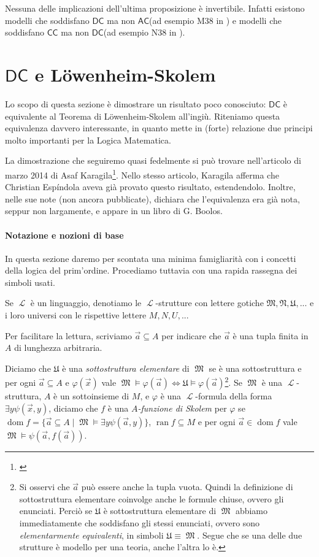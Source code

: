 \documentclass[12pt,a4paper]{report}
\theoremstyle{definition}
\theoremstyle{num.custom-title}
\DeclareMathOperator{\dom}{dom}
\DeclareMathOperator{\ran}{ran}
\DeclareMathOperator{\U}{\mathcal{U}}
\DeclareMathOperator{\LL}{\mathcal{L}}
\DeclareMathOperator{\M}{\mathfrak{M}}
\DeclareMathOperator{\sse}{\subseteq}
\newcommand{\AC}{\ensuremath{\mathsf{AC}}\xspace}
\newcommand{\CC}{\ensuremath{\mathsf{CC}}\xspace}
\newcommand{\DC}{\ensuremath{\mathsf{DC}}\xspace}
\renewcommand{\phi}{\varphi}
\renewcommand{\U}{\mathfrak{U}}
\begin{document}
Nessuna delle implicazioni dell'ultima proposizione è invertibile. Infatti esistono modelli che soddisfano \DC ma non \AC (ad esempio M38 in \cite{HoRu98:Herrlich}) e modelli che soddisfano \CC ma non \DC (ad esempio N38 in \cite{HoRu98:Herrlich}).

\section*{\DC e Löwenheim-Skolem}

Lo scopo di questa sezione è dimostrare un risultato poco conosciuto: \DC è equivalente al Teorema di Löwenheim-Skolem all'ingiù. Riteniamo questa equivalenza davvero interessante, in quanto mette in (forte) relazione due principi molto importanti per la Logica Matematica.

La dimostrazione che seguiremo quasi fedelmente si può trovare nell'articolo di marzo 2014 di Asaf Karagila\footnote{\cite{Kar2014:web}}. Nello stesso articolo, Karagila afferma che Christian Espíndola aveva già provato questo risultato, estendendolo. Inoltre, nelle sue note (non ancora pubblicate), dichiara che l'equivalenza era già nota, seppur non largamente, e appare in un libro di G. Boolos.

\paragraph{Notazione e nozioni di base}

In questa sezione daremo per scontata una minima famigliarità con i concetti della logica del prim'ordine. Procediamo tuttavia con una rapida rassegna dei simboli usati.

Se $\LL$ è un linguaggio, denotiamo le $\LL$-strutture con lettere gotiche $\mathfrak{M, N, U,...}$ e i loro universi con le rispettive lettere $M, N, U,...$

Per facilitare la lettura, scriviamo $\vec a \sse A$ per indicare che $\vec a$ è una tupla finita in $A$ di lunghezza arbitraria.

Diciamo che $\U$ è una \emph{sottostruttura elementare} di $\M$ se è una sottostruttura e per ogni $\vec a \sse A$ e $\phi(\vec x)$ vale $\M \models \phi(\vec a) \iff \U \models \phi (\vec a)$\footnote{Si osservi che $\vec a$ può essere anche la tupla vuota. Quindi la definizione di sottostruttura elementare coinvolge anche le formule chiuse, ovvero gli enunciati. Perciò se $\U$ è sottostruttura elementare di $\M$ abbiamo immediatamente che soddisfano gli stessi enunciati, ovvero sono \emph{elementarmente equivalenti}, in simboli $\U \equiv \M$. Segue che se una delle due strutture è modello per una teoria, anche l'altra lo è.}. Se $\M$ è una $\LL$-struttura, $A$ è un sottoinsieme di $M$, e $\phi$ è una $\LL$-formula della forma $\exists y \psi(\vec x, y)$, diciamo che $f$ è una $A$\emph{-funzione di Skolem} per $\phi$ se $\dom f = \{\vec a \sse A \mid \M \models \exists y \psi(\vec a, y)\}$, $\ran f \sse M$ e per ogni $\vec a \in \dom f$ vale $\M \models \psi(\vec a, f(\vec a))$.
\end{document}
